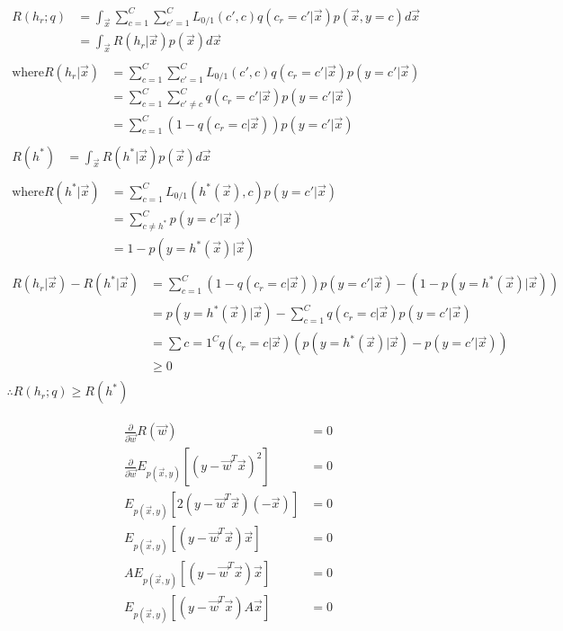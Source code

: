 \documentclass{introtosml}
\newcommand\Ep[1]{E_{p(\vec{x}, y)} \left[ #1 \right]}
\newcommand{\x}{\vec{x}}
\newcommand{\q}{q(c_r = c' | \x)}
\newcommand{\qc}{q(c_r = c | \x)}
\newcommand{\pyx}[1]{p(y = #1 | \x)}
\newcommand{\pyxh}{\pyx{h^*(\x)}}
\newcommand{\pyxc}{\pyx{c'}}
\newcommand{\intx}[1]{\int_\vec{x} #1 d\vec{x}}
\newcommand{\R}[1]{R(#1 | \vec{x})}
\begin{document}
\maketitle

\begin{p}
  \item
    \begin{gather*}
      \begin{aligned}
        R(h_r; q)
        & = \intx{\sum_{c=1}^C \sum_{c'=1}^C L_{0/1}(c', c) \q p(\vec{x}, y = c)} \\
        & = \intx{\R{h_r} p(\vec{x})}
      \end{aligned} \\
      \begin{aligned}
        \text{where} \R{h_r}
        & = \sum_{c=1}^C \sum_{c'=1}^C L_{0/1} (c', c) \q \pyxc \\
        & = \sum_{c=1}^C \sum_{c' \ne c}^C \q \pyxc \\
        & = \sum_{c=1}^C (1 - \qc) \pyxc
      \end{aligned} \\
      \begin{aligned}
        R(h^*) & = \intx{\R{h^*} p(\vec{x})}
      \end{aligned} \\
      \begin{aligned}
        \text{where} \R{h^*}
        & = \sum_{c=1}^C L_{0/1} (h^*(\vec{x}), c) \pyxc \\
        & = \sum_{c \ne h^*}^C \pyxc \\
        & = 1 - \pyxh
      \end{aligned} \\
      \begin{aligned}
        \R{h_r} - \R{h^*}
        & = \sum_{c=1}^C (1 - \qc) \pyxc - (1 - \pyxh) \\
        & = \pyxh - \sum_{c=1}^C \qc \pyxc \\
        & = \sum{c=1}^C \qc (\pyxh - \pyxc) \\
        & \ge 0
      \end{aligned} \\
      \therefore R(h_r; q) \ge R(h^*)
    \end{gather*}

  \item
    \begin{align*}
      \frac{\partial}{\partial \vec{w}} R(\vec{w}) & = 0 \\
      \frac{\partial}{\partial \vec{w}} \Ep{(y - {\vec{w}}^T \vec{x})^2 } & = 0 \\
      \Ep{2 (y - {\vec{w}}^T \vec{x}) (-\vec{x})} & = 0 \\
      \Ep{(y - {\vec{w}}^T \vec{x}) \vec{x}} & = 0 \label{eq:corr0} \\
      A \Ep{(y - {\vec{w}}^T \vec{x}) \vec{x}} & = 0 \\
      \Ep{(y - {\vec{w}}^T \vec{x}) A \vec{x}} & = 0
    \end{align*}


\end{p}
\end{document}
